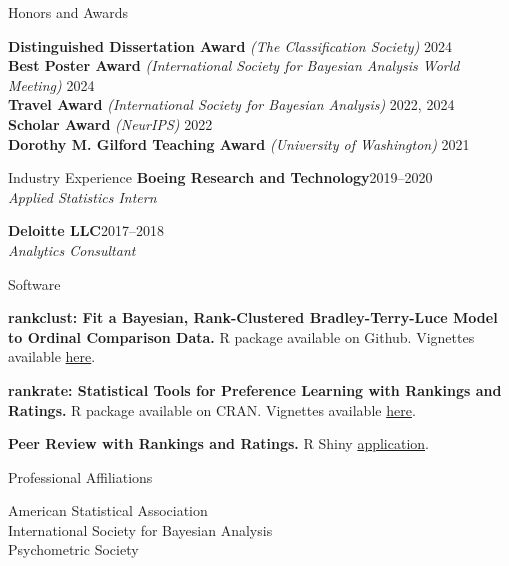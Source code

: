 \documentclass{resume} %
\begin{document}
\begin{rSection}{Honors and Awards}

\textbf{Distinguished Dissertation Award} {\it (The Classification Society)} \hfill {2024}
\\ \textbf{Best Poster Award} {\it (International Society for Bayesian Analysis World Meeting)} \hfill {2024}
\\ \textbf{Travel Award} {\it (International Society for Bayesian Analysis)} \hfill {2022, 2024}
\\ \textbf{Scholar Award} {\it (NeurIPS)} \hfill {2022}
\\ \textbf{Dorothy M. Gilford Teaching Award} {\it (University of Washington)} \hfill {2021}

\end{rSection}


\begin{rSection}{Industry Experience}
\textbf{Boeing Research and Technology}\hfill{2019--2020}
\\{\it Applied Statistics Intern}

\textbf{Deloitte LLC}\hfill{2017--2018}
\\{\it Analytics Consultant}

\end{rSection}

\begin{rSection}{Software}

\textbf{rankclust: Fit a Bayesian, Rank-Clustered Bradley-Terry-Luce Model to Ordinal Comparison Data.} R package available on Github. Vignettes available \href{https://pearce790.github.io/rankclust/}{here}.

\textbf{rankrate: Statistical Tools for Preference Learning with Rankings and Ratings.} R package available on CRAN. Vignettes available \href{https://pearce790.github.io/rankrate/}{here}.

\textbf{Peer Review with Rankings and Ratings.} R Shiny \href{https://pearce790.shinyapps.io/rankrate_PeerReview/}{application}.

\end{rSection}

\begin{rSection}{Professional Affiliations}

American Statistical Association
\\ International Society for Bayesian Analysis
\\ Psychometric Society

\end{rSection}
\end{document}
